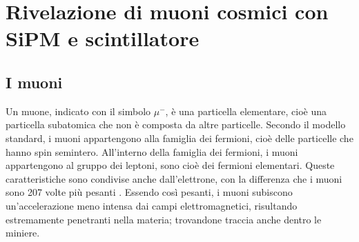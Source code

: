 \chapter[Rivelazione di muoni cosmici]{Rivelazione di muoni cosmici con SiPM e scintillatore}\label{cap3}
\section{I muoni}
Un muone, indicato con il simbolo $\mu^-$, è una particella elementare, cioè una particella subatomica che non è composta da altre particelle. Secondo il modello standard,
i muoni appartengono alla famiglia dei fermioni, cioè delle particelle che hanno spin semintero. All'interno della famiglia dei fermioni,
i muoni appartengono al gruppo dei leptoni, sono cioè dei fermioni elementari. Queste caratteristiche sono condivise anche dall'elettrone,
con la differenza che i muoni sono 207 volte più pesanti \cite{officeofscience_doe}. Essendo così pesanti, i muoni subiscono un'accelerazione meno intensa dai campi
elettromagnetici, risultando estremamente penetranti nella materia; trovandone traccia anche dentro le miniere.

